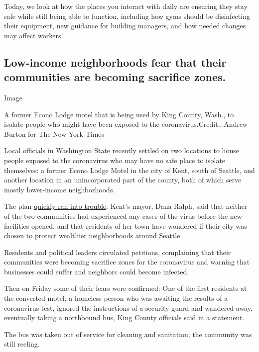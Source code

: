 Today, we look at how the places you interact with daily are ensuring
they stay safe while still being able to function, including how gyms
should be disinfecting their equipment, new guidance for building
managers, and how needed changes may affect workers.

\hypertarget{low-income-neighborhoods-fear-that-their-communities-are-becoming-sacrifice-zones}{%
\subsection{Low-income neighborhoods fear that their communities are
becoming sacrifice
zones.}\label{low-income-neighborhoods-fear-that-their-communities-are-becoming-sacrifice-zones}}

Image

A former Econo Lodge motel that is being used by King County, Wash., to
isolate people who might have been exposed to the
coronavirus.Credit...Andrew Burton for The New York Times

Local officials in Washington State recently settled on two locations to
house people exposed to the coronavirus who may have no safe place to
isolate themselves: a former Econo Lodge Motel in the city of Kent,
south of Seattle, and another location in an unincorporated part of the
county, both of which serve mostly lower-income neighborhoods.

The plan
\href{https://www.nytimes3xbfgragh.onion/2020/03/13/us/coronavirus-seattle-isolation-housing.html}{quickly
ran into trouble}. Kent's mayor, Dana Ralph, said that neither of the
two communities had experienced any cases of the virus before the new
facilities opened, and that residents of her town have wondered if their
city was chosen to protect wealthier neighborhoods around Seattle.

Residents and political leaders circulated petitions, complaining that
their communities were becoming sacrifice zones for the coronavirus and
warning that businesses could suffer and neighbors could become
infected.

Then on Friday some of their fears were confirmed: One of the first
residents at the converted motel, a homeless person who was awaiting the
results of a coronavirus test, ignored the instructions of a security
guard and wandered away, eventually taking a northbound bus, King County
officials said in a statement.

The bus was taken out of service for cleaning and sanitation; the
community was still reeling.

